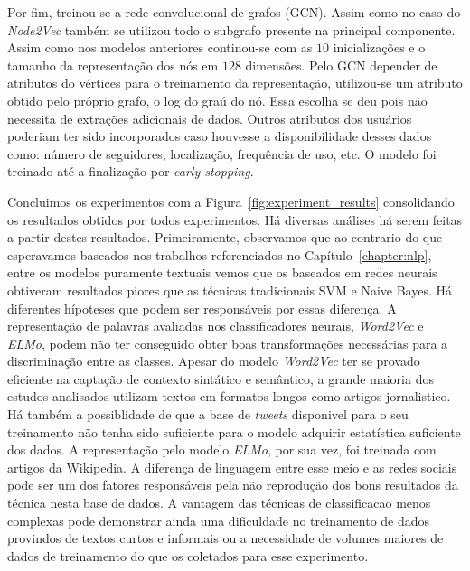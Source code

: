Por fim, treinou-se a rede convolucional de grafos (GCN).
Assim como no caso do \textit{Node2Vec} também se utilizou todo o subgrafo
presente na principal componente.
Assim como nos modelos anteriores continou-se com as $10$ inicializações e o
tamanho da representação dos nós em $128$ dimensões.
Pelo GCN depender de atributos do vértices para o treinamento da representação,
utilizou-se um atributo obtido pelo próprio grafo, o log do graú do nó.
Essa escolha se deu pois não necessita de extrações adicionais de dados.
Outros atributos dos usuários poderiam ter sido incorporados caso houvesse a
disponibilidade desses dados como: número de seguidores, localização,
frequência de uso, etc.
O modelo foi treinado até a finalização por \textit{early stopping}.


Concluimos os experimentos com a Figura~\ref{fig:experiment_results}
consolidando os resultados obtidos por todos experimentos.
Há diversas análises há serem feitas a partir destes resultados.
Primeiramente, observamos que ao contrario do que esperavamos baseados nos
trabalhos referenciados no Capítulo~\ref{chapter:nlp}, entre os modelos
puramente textuais vemos que os baseados em redes neurais obtiveram resultados
piores que as técnicas tradicionais SVM e Naive Bayes.
Há diferentes hípoteses que podem ser responsáveis por essas diferença.
A representação de palavras avaliadas nos classificadores neurais,
\textit{Word2Vec} e \textit{ELMo}, podem não ter conseguido obter boas
transformações necessárias para a discriminação entre as classes.
Apesar do modelo \textit{Word2Vec} ter se provado eficiente na captação de
contexto sintático e semântico, a grande maioria dos estudos analisados utilizam
textos em formatos longos como artigos jornalistico.
Há também a possiblidade de que a base de \textit{tweets} disponivel para o seu
treinamento não tenha sido suficiente para o modelo adquirir estatística
suficiente dos dados.
A representação pelo modelo \textit{ELMo}, por sua vez, foi treinada com artigos
da Wikipedia.
A diferença de linguagem entre esse meio e as redes sociais pode ser um dos
fatores responsáveis pela não reprodução dos bons resultados da técnica nesta
base de dados.
A vantagem das técnicas de classificacao menos complexas pode demonstrar ainda
uma dificuldade no treinamento de dados provindos de textos curtos e informais
ou a necessidade de volumes maiores de dados de treinamento do que os coletados
para esse experimento.

